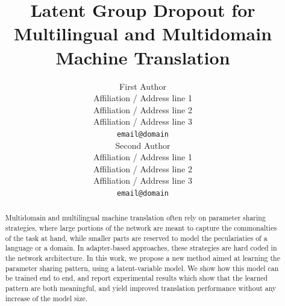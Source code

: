 \documentclass[11pt]{article}
\title{Latent Group Dropout for Multilingual and Multidomain Machine Translation}
\author{First Author \\
  Affiliation / Address line 1 \\
  Affiliation / Address line 2 \\
  Affiliation / Address line 3 \\
  \texttt{email@domain} \\\And
  Second Author \\
  Affiliation / Address line 1 \\
  Affiliation / Address line 2 \\
  Affiliation / Address line 3 \\
  \texttt{email@domain} \\}
\begin{document}
\maketitle

\begin{abstract}
  Multidomain and multilingual machine translation often rely on parameter sharing strategies, where large portions of the network are meant to capture the commonalties of the task at hand, while smaller parts are reserved to model the peculariaties of a language or a domain. In adapter-based approaches, these strategies are hard coded in the network architecture. In this work, we propose a new method aimed at learning the parameter sharing pattern, using a latent-variable model. We show how this model can be trained end to end, and report experimental results which show that the learned pattern are both meaningful, and yield improved translation performance without any increase of the model size. 
\end{abstract}
\end{document}
